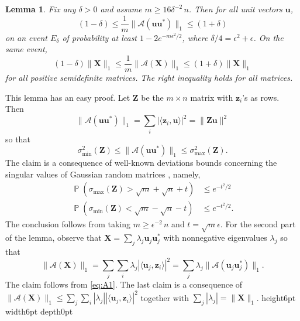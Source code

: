 \documentclass[11pt]{article}
\newtheorem{lemma}[theorem]{Lemma}
\newcommand{\<}{\langle}
\renewcommand{\>}{\rangle}
\renewcommand{\P}{\operatorname{\mathbb{P}}}
\newcommand{\bX}{\bm{X}}
\newcommand{\bZ}{\bm{Z}}
\newcommand{\bu}{\bm{u}}
\newcommand{\bz}{\bm{z}}
\numberwithin{equation}{section}
\def \endprf{\hfill {\vrule height6pt width6pt depth0pt}\medskip}
\newenvironment{proof}{\noindent {\bf Proof} }{\endprf\par}
\newcommand{\cA}{\mathcal{A}}
\begin{document}
\begin{lemma}
  \label{lem:A1}
  Fix any $\delta > 0$ and assume $m \ge 16 \delta^{-2} \, n$. Then
  for all unit vectors $\bu$,
\begin{equation}
\label{eq:A1}
(1-\delta) \le \frac{1}{m} \|\cA(\bu\bu^*)\|_1 \le (1+\delta) 
\end{equation}
on an event $E_\delta$ of probability at least $1-2e^{-m
  \epsilon^2/2}$, where $\delta/4 = \epsilon^2 + \epsilon$. On the
same event,
\[
(1-\delta) \|\bX\|_1 \le \frac{1}{m} \|\cA(\bX)\|_1 \le (1+\delta) \|\bX\|_1 
\]
for all positive semidefinite matrices. The right inequality holds for
all matrices.
\end{lemma}
\begin{proof} This lemma has an easy proof. Let $\bZ$ be the $m \times
  n$ matrix with $\bz_i$'s as rows. Then 
\[
\|\cA(\bu\bu^*)\|_1 = \sum_i |\<\bz_i, \bu\>|^2 = \|\bZ \bu\|^2 
\]
so that 
\[
\sigma^2_{\text{min}}(\bZ) \le \|\cA(\bu\bu^*)\|_1 \le
\sigma^2_{\text{max}}(\bZ). 
\]
The claim is a consequence of well-known deviations bounds concerning
the singular values of Gaussian random matrices \cite{VershyninRMT},
namely,
\begin{align*}
\P\left(\sigma_{\text{max}} (\bZ) > \sqrt{m} + \sqrt{n} + t\right)  & \le e^{- t^2/2}\\
\P\left(\sigma_{\text{min}}(\bZ) < \sqrt{m} - \sqrt{n} - t\right)  & \le e^{- t^2/2}.
\end{align*}
The conclusion follows from taking $m \ge \epsilon^{-2} \, n$ and $t =
\sqrt{m} \epsilon$. For the second part of the lemma, observe that $\bX
= \sum_j \lambda_j \bu_j \bu_j^*$ with nonnegative eigenvalues $\lambda_j$
so that
\[
\|\cA(\bX)\|_1 = \sum_j \sum_i \lambda_j |\<\bu_j,\bz_i\>|^2 = \sum_j
\lambda_j \|\cA(\bu_j \bu_j^*)\|_1. 
\]
The claim follows from \eqref{eq:A1}. The last claim is a consequence
of $\|\cA(\bX)\|_1 \le \sum_j \sum_i |\lambda_j| |\<\bu_j,\bz_i\>|^2$
together with $\sum_j |\lambda_j| = \|\bX\|_1$.
\end{proof}

\end{document}
